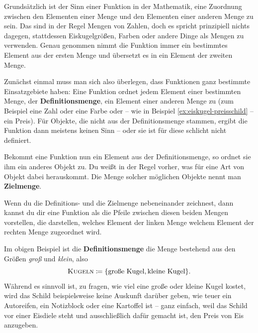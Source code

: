 \documentclass[../../main.tex]{subfiles}
\begin{document}
Grundsätzlich ist der Sinn einer Funktion in der Mathematik, eine Zuordnung zwischen den Elementen einer Menge und den Elementen einer anderen Menge zu sein. Das sind in der Regel Mengen von Zahlen, doch es spricht prinzipiell nichts dagegen, stattdessen Eiskugelgrößen, Farben oder andere Dinge als Mengen zu verwenden. Genau genommen nimmt die Funktion immer ein bestimmtes Element aus der ersten Menge und übersetzt es in ein Element der zweiten Menge.

\parpic[r]{
}
Zunächst einmal muss man sich also überlegen, dass Funktionen ganz bestimmte Einsatzgebiete haben: Eine Funktion ordnet jedem Element einer bestimmten Menge, der \textbf{Definitionsmenge}, ein Element einer anderen Menge zu (zum Beispiel eine Zahl oder eine Farbe oder -- wie in Beispiel \ref{ex:eiskugel-preisschild} -- ein Preis). Für Objekte, die nicht aus der Definitionsmenge stammen, ergibt die Funktion dann meistens keinen Sinn -- oder sie ist für diese schlicht nicht definiert.

Bekommt eine Funktion nun ein Element aus der Definitionsmenge, so ordnet sie ihm ein anderes Objekt zu. Du weißt in der Regel vorher, was für eine Art von Objekt dabei herauskommt. Die Menge solcher möglichen Objekte nennt man \textbf{Zielmenge}.

Wenn du die Definitions- und die Zielmenge nebeneinander zeichnest, dann kannst du dir eine Funktion als die Pfeile zwischen diesen beiden Mengen vorstellen, die darstellen, welches Element der linken Menge welchem Element der rechten Menge zugeordnet wird.

\begin{example}{}
    Im obigen Beispiel ist die \textbf{Definitionsmenge} die Menge bestehend aus den Größen \emph{groß} und \emph{klein}, also 
    \[\textsc{Kugeln}\coloneqq\{\text{große Kugel},\text{kleine Kugel}\}.\]
    Während es sinnvoll ist, zu fragen, wie viel eine große oder kleine Kugel kostet, wird das Schild beispielsweise keine Auskunft darüber geben, wie teuer ein Autoreifen, ein Notizblock oder eine Kartoffel ist -- ganz einfach, weil das Schild vor einer Eisdiele steht und ausschließlich dafür gemacht ist, den Preis von Eis anzugeben.
\end{example}
\end{document}
